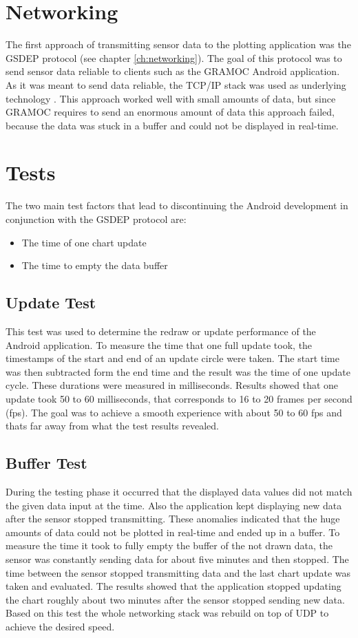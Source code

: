 \section{Networking}
The first approach of transmitting sensor data to the plotting application was the GSDEP protocol (see chapter \vref{ch:networking}). The goal of this protocol was to send sensor data reliable to clients such as the GRAMOC Android application. As it was meant to send data reliable, the TCP/IP stack was used as underlying technology \autocite{rfc793} \autocite{rfc791}. This approach worked well with small amounts of data, but since GRAMOC requires to send an enormous amount of data this approach failed, because the data was stuck in a buffer and could not be displayed in real-time.

\section{Tests}
\label{sec:Tests}
The two main test factors that lead to discontinuing the Android development in conjunction with the GSDEP protocol are:

\begin{itemize}
    \item The time of one chart update
    \item The time to empty the data buffer
\end{itemize}

\subsection{Update Test}
This test was used to determine the redraw or update performance of the Android application. To measure the time that one full update took, the timestamps of the start and end of an update circle were taken. The start time was then subtracted form the end time and the result was the time of one update cycle. These durations were measured in milliseconds. Results showed that one update took 50 to 60 milliseconds, that corresponds to 16 to 20 frames per second (fps). The goal was to achieve a smooth experience with about 50 to 60 fps and thats far away from what the test results revealed.

\subsection{Buffer Test}
During the testing phase it occurred that the displayed data values did not match the given data input at the time. Also the application kept displaying new data after the sensor stopped transmitting. These anomalies indicated that the huge amounts of data could not be plotted in real-time and ended up in a buffer. To measure the time it took to fully empty the buffer of the not drawn data, the sensor was constantly sending data for about five minutes and then stopped. The time between the sensor stopped transmitting data and the last chart update was taken and evaluated. The results showed that the application stopped updating the chart roughly about two minutes after the sensor stopped sending new data. Based on this test the whole networking stack was rebuild on top of UDP to achieve the desired speed.

